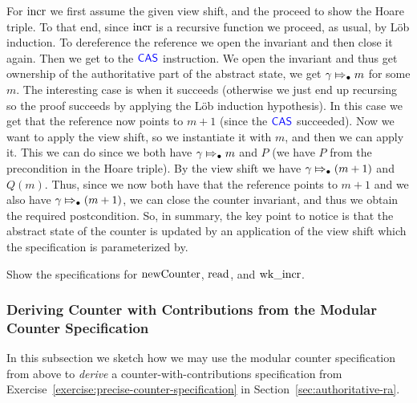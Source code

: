 For $\operatorname{incr}$ we first assume the given view shift, and the proceed to show the Hoare triple.
To that end, since $\operatorname{incr}$ is a recursive function we proceed, as usual, by L{\"o}b induction. To dereference the reference we open the invariant and then close it again. Then we get to the $\textsf{\color{blue} CAS}$ instruction.
We open the invariant and thus get ownership of the authoritative part of the abstract state, \ie{} we get
$\gamma \Mapsto_{\bullet} m$ for some $m$.
The interesting case is when it succeeds (otherwise we just end up recursing so the proof succeeds by applying the L{\"o}b induction hypothesis).
In this case we get that the reference now points to $m+1$ (since the $\textsf{\color{blue} CAS}$ succeeded). 
Now we want to apply the view shift, so we instantiate it with $m$, and then we can apply it.
This we can do since we both have $\gamma \Mapsto_{\bullet} m$ and $P$ (we have $P$ from the precondition in the Hoare triple).
By the view shift we have $\gamma \Mapsto_{\bullet} (m+1)$ and $Q(m)$.
Thus, since we now both have that the reference points to $m+1$ and we also have $\gamma \Mapsto_{\bullet} (m+1)$,
we can close the counter invariant, and thus we obtain the required postcondition.
So, in summary, the key point to notice is that the abstract state of the counter is updated by an application
of the view shift which the specification is parameterized by.

\begin{exercise}
  Show the specifications for $\operatorname{newCounter}$, $\operatorname{read}$, and $\operatorname{wk{\_}incr}$.
\end{exercise}

\subsubsection{Deriving Counter with Contributions from the Modular Counter Specification}
\label{sec:deriving-ccounter-from-modular-conter}

In this subsection we sketch how we may use the modular counter specification from above to \emph{derive} a counter-with-contributions specification from Exercise~\ref{exercise:precise-counter-specification} in Section~\ref{sec:authoritative-ra}.

